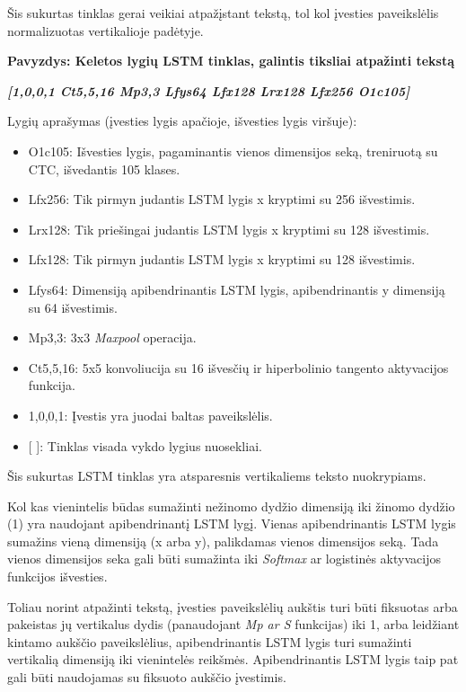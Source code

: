 \documentclass{VUMIFInfBakalaurinis}
\begin{document}
Šis sukurtas tinklas gerai veikiai atpažįstant tekstą, tol kol įvesties paveikslėlis normalizuotas vertikalioje padėtyje.

\textbf{Pavyzdys: Keletos lygių LSTM tinklas, galintis tiksliai atpažinti tekstą}

\textbf{\textit{[1,0,0,1 Ct5,5,16 Mp3,3 Lfys64 Lfx128 Lrx128 Lfx256 O1c105]}}

Lygių aprašymas (įvesties lygis apačioje, išvesties lygis viršuje):

\begin{itemize}[itemsep=0.5pt]
  \item O1c105: Išvesties lygis, pagaminantis vienos dimensijos seką, treniruotą su CTC, išvedantis 105 klases.
  \item Lfx256: Tik pirmyn judantis LSTM lygis x kryptimi su 256 išvestimis.
  \item Lrx128: Tik priešingai judantis LSTM lygis x kryptimi su 128 išvestimis.
  \item Lfx128: Tik pirmyn judantis LSTM lygis x kryptimi su 128 išvestimis.
  \item Lfys64: Dimensiją apibendrinantis LSTM lygis, apibendrinantis y dimensiją su 64 išvestimis.
  \item Mp3,3: 3x3 \textit{Maxpool} operacija.
  \item Ct5,5,16: 5x5 konvoliucija su 16 išvesčių ir hiperbolinio tangento aktyvacijos funkcija.
  \item 1,0,0,1: Įvestis yra juodai baltas paveikslėlis.
  \item {[ ]}: Tinklas visada vykdo lygius nuosekliai.
\end{itemize}

Šis sukurtas LSTM tinklas yra atsparesnis vertikaliems teksto nuokrypiams.

Kol kas vienintelis būdas sumažinti nežinomo dydžio dimensiją iki žinomo dydžio (1) yra naudojant apibendrinantį LSTM lygį.
Vienas apibendrinantis LSTM lygis sumažins vieną dimensiją (x arba y), palikdamas vienos dimensijos seką.
Tada vienos dimensijos seka gali būti sumažinta iki \textit{Softmax} ar logistinės aktyvacijos funkcijos išvesties.

Toliau norint atpažinti tekstą, įvesties paveikslėlių aukštis turi būti fiksuotas arba pakeistas jų vertikalus dydis (panaudojant \textit{Mp ar S} funkcijas) iki 1,
arba leidžiant kintamo aukščio paveikslėlius, apibendrinantis LSTM lygis turi sumažinti vertikalią dimensiją iki vienintelės reikšmės.
Apibendrinantis LSTM lygis taip pat gali būti naudojamas su fiksuoto aukščio įvestimis.
\end{document}
